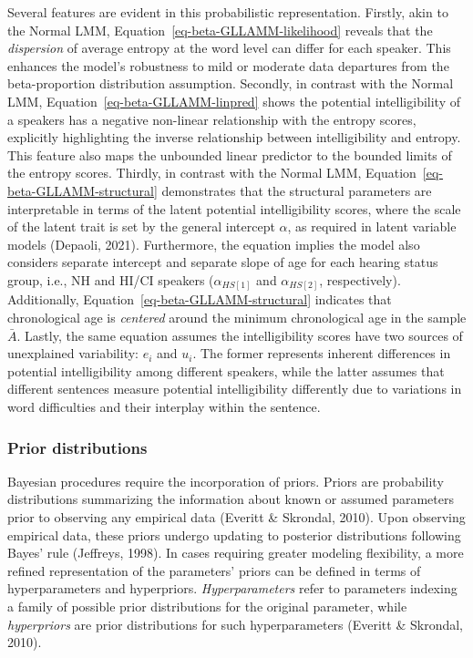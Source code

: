 \documentclass[
]{agujournal2019}
\begin{document}
Several features are evident in this probabilistic representation.
Firstly, akin to the Normal LMM,
Equation~\ref{eq-beta-GLLAMM-likelihood} reveals that the
\emph{dispersion} of average entropy at the word level can differ for
each speaker. This enhances the model's robustness to mild or moderate
data departures from the beta-proportion distribution assumption.
Secondly, in contrast with the Normal LMM,
Equation~\ref{eq-beta-GLLAMM-linpred} shows the potential
intelligibility of a speakers has a negative non-linear relationship
with the entropy scores, explicitly highlighting the inverse
relationship between intelligibility and entropy. This feature also maps
the unbounded linear predictor to the bounded limits of the entropy
scores. Thirdly, in contrast with the Normal LMM,
Equation~\ref{eq-beta-GLLAMM-structural} demonstrates that the
structural parameters are interpretable in terms of the latent potential
intelligibility scores, where the scale of the latent trait is set by
the general intercept \(\alpha\), as required in latent variable models
(Depaoli, 2021). Furthermore, the equation implies the model also
considers separate intercept and separate slope of age for each hearing
status group, i.e., NH and HI/CI speakers (\(\alpha_{HS[1]}\) and
\(\alpha_{HS[2]}\), respectively). Additionally,
Equation~\ref{eq-beta-GLLAMM-structural} indicates that chronological
age is \emph{centered} around the minimum chronological age in the
sample \(\bar{A}\). Lastly, the same equation assumes the
intelligibility scores have two sources of unexplained variability:
\(e_{i}\) and \(u_{i}\). The former represents inherent differences in
potential intelligibility among different speakers, while the latter
assumes that different sentences measure potential intelligibility
differently due to variations in word difficulties and their interplay
within the sentence.

\subsubsection{Prior distributions}\label{sec-M-SM-P}

Bayesian procedures require the incorporation of priors. Priors are
probability distributions summarizing the information about known or
assumed parameters prior to observing any empirical data (Everitt \&
Skrondal, 2010). Upon observing empirical data, these priors undergo
updating to posterior distributions following Bayes' rule (Jeffreys,
1998). In cases requiring greater modeling flexibility, a more refined
representation of the parameters' priors can be defined in terms of
hyperparameters and hyperpriors. \emph{Hyperparameters} refer to
parameters indexing a family of possible prior distributions for the
original parameter, while \emph{hyperpriors} are prior distributions for
such hyperparameters (Everitt \& Skrondal, 2010).
\end{document}
